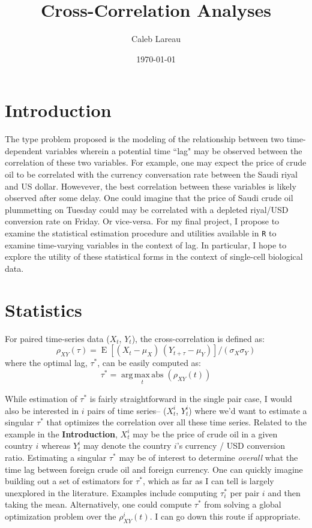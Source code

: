 \documentclass{article}\usepackage[]{graphicx}\usepackage[]{color}
\title{Cross-Correlation Analyses}
\author{Caleb Lareau}
\date{\today}
\begin{document}
\maketitle

\section*{Introduction}
The type problem proposed is the modeling of the relationship between two time-dependent variables wherein a potential time ``lag" may be observed between the correlation of these two variables. For example, one may expect the price of crude oil to be correlated with the currency conversation rate between the Saudi riyal and US dollar. Howevever, the best correlation between these variables is likely observed after some delay. One could imagine that the price of Saudi crude oil plummetting on Tuesday could may be correlated with a depleted riyal/USD conversion rate on Friday. Or vice-versa. For my final project, I propose to examine the statistical estimation procedure and utilities available in \texttt{R} to examine time-varying variables in the context of lag. In particular, I hope to explore the utility of these statistical forms in the context of single-cell biological data. 

\section*{Statistics}
For paired time-series data ($X_{t}$, $Y_{t}$), the cross-correlation is defined as:
$$\rho _{XY}(\tau )=\operatorname {E} [(X_{t}-\mu _{X})\,(Y_{t+\tau }-\mu _{Y})]/(\sigma _{X}\sigma _{Y})$$
where the optimal lag, $\tau^*$, can be easily computed as:
$$ \tau^*={\underset {t}{\operatorname {arg\,max\,abs} }}(\rho _{XY}(t))$$

\noindent While estimation of $\tau^*$ is fairly straightforward in the single pair case, I would also be interested in $i$ pairs of time series-- ($X_{t}^i$, $Y_{t}^i$) where we'd want to estimate a singular $\tau^*$ that optimizes the correlation over all these time series. Related to the example in the \textbf{Introduction}, $X_{t}^i$ may be the price of crude oil in a given country $i$ whereas $Y_{t}^i$ may denote the country $i$'s currency / USD conversion ratio. Estimating a singular $\tau^*$ may be of interest to determine \textit{overall} what the time lag between foreign crude oil and foreign currency. One can quickly imagine building out a set of estimators for $\tau^*$, which as far as I can tell is largely unexplored in the literature. Examples include computing $\tau_i^*$ per pair $i$ and then taking the mean. Alternatively, one could compute  $\tau^*$ from solving a global optimization problem over the $\rho _{XY}^i(t)$. I can go down this route if appropriate. 
\end{document}
